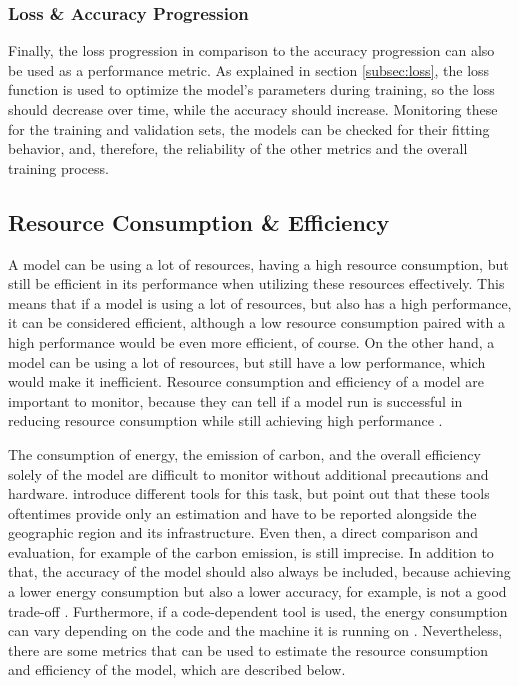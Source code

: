 \subsubsection*{Loss \& Accuracy Progression}

Finally, the loss progression in comparison to the accuracy progression can also be used as a performance metric. As explained in section \ref{subsec:loss}, the loss function is used to optimize the model's parameters during training, so the loss should decrease over time, while the accuracy should increase. Monitoring these for the training and validation sets, the models can be checked for their fitting behavior, and, therefore, the reliability of the other metrics and the overall training process.

\subsection{Resource Consumption \& Efficiency}

A model can be using a lot of resources, having a high resource consumption, but still be efficient in its performance when utilizing these resources effectively. This means that if a model is using a lot of resources, but also has a high performance, it can be considered efficient, although a low resource consumption paired with a high performance would be even more efficient, of course. On the other hand, a model can be using a lot of resources, but still have a low performance, which would make it inefficient. Resource consumption and efficiency of a model are important to monitor, because they can tell if a model run is successful in reducing resource consumption while still achieving high performance \autocite{Li.Jiang.ea2021,Xu.Zhou.ea2021}.

The consumption of energy, the emission of carbon, and the overall efficiency solely of the model are difficult to monitor without additional precautions and hardware. \textcite{Mehlin.Schacht.ea2023} introduce different tools for this task, but point out that these tools oftentimes provide only an estimation and have to be reported alongside the geographic region and its infrastructure. Even then, a direct comparison and evaluation, for example of the carbon emission, is still imprecise. In addition to that, the accuracy of the model should also always be included, because achieving a lower energy consumption but also a lower accuracy, for example, is not a good trade-off \autocite{Li.Jiang.ea2021,Tao.Meng.ea2022}. Furthermore, if a code-dependent tool is used, the energy consumption can vary depending on the code and the machine it is running on \autocite{Mehlin.Schacht.ea2023}. Nevertheless, there are some metrics that can be used to estimate the resource consumption and efficiency of the model, which are described below.

